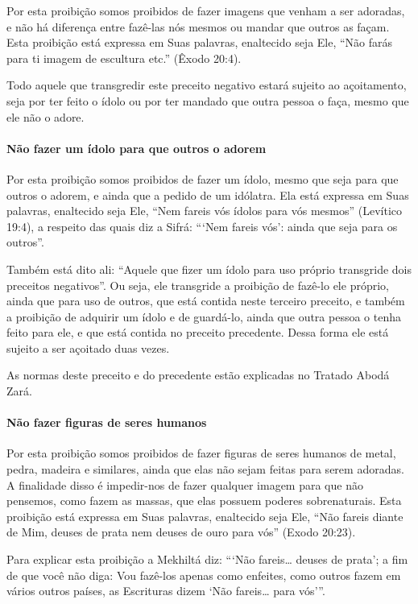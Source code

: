 Por esta proibição somos proibidos de fazer imagens que venham a ser
adoradas, e não há diferença entre fazê-las nós mesmos ou mandar que
outros as façam. Esta proibição está expressa em Suas palavras,
enaltecido seja Ele, ``Não farás para ti imagem de escultura etc.''
(Êxodo 20:4).

Todo aquele que transgredir este preceito negativo estará sujeito ao
açoitamento, seja por ter feito o ídolo ou por ter mandado que outra
pessoa o faça, mesmo que ele não o adore.

\paragraph{Não fazer um ídolo para que outros o adorem}

Por esta proibição somos proibidos de fazer um ídolo, mesmo que seja
para que outros o adorem, e ainda que a pedido de um idólatra. Ela está
expressa em Suas palavras, enaltecido seja Ele, ``Nem fareis vós ídolos
para vós mesmos'' (Levítico 19:4), a respeito das quais diz a Sifrá:
```Nem fareis vós': ainda que seja para os outros''.

Também está dito ali: ``Aquele que fizer um ídolo para uso próprio
transgride dois preceitos negativos''. Ou seja, ele transgride a
proibição de fazê-lo ele próprio, ainda que para uso de outros, que está
contida neste terceiro preceito, e também a proibição de adquirir um
ídolo e de guardá-lo, ainda que outra pessoa o tenha feito para ele, e
que está contida no preceito precedente. Dessa forma ele está sujeito a
ser açoitado duas vezes.

As normas deste preceito e do precedente estão explicadas no Tratado
Abodá Zará.

\paragraph{Não fazer figuras de seres humanos}

Por esta proibição somos proibidos de fazer figuras de seres humanos de
metal, pedra, madeira e similares, ainda que elas não sejam feitas para
serem adoradas. A finalidade disso é impedir-nos de fazer qualquer
imagem para que não pensemos, como fazem as massas, que elas possuem
poderes sobrenaturais. Esta proibição está expressa em Suas palavras,
enaltecido seja Ele, ``Não fareis diante de Mim, deuses de prata nem
deuses de ouro para vós'' (Exodo 20:23).

Para explicar esta proibição a Mekhiltá diz: ```Não fareis\ldots{} deuses de
prata'; a fim de que você não diga: Vou fazê-los apenas como enfeites,
como outros fazem em vários outros países, as Escrituras dizem `Não
fareis\ldots{} para vós'''.

